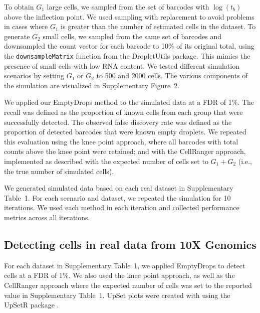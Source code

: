 \documentclass[10pt,letterpaper]{article}
\newcommand{\code}[1]{\texttt{#1}}
\newcommand{\supptabdataset}{1}
\newcommand{\suppfigsimdesign}{2}
\begin{document}
To obtain $G_1$ large cells, we sampled from the set of barcodes with $\log(t_b)$ above the inflection point.
We used sampling with replacement to avoid problems in cases where $G_1$ is greater than the number of estimated cells in the dataset.
To generate $G_2$ small cells, we sampled from the same set of barcodes and downsampled the count vector for each barcode to 10\% of its original total,
using the \code{downsampleMatrix} function from the \textsf{DropletUtils} package.
This mimics the presence of small cells with low RNA content. 
We tested different simulation scenarios by setting $G_1$ or $G_2$ to 500 and 2000 cells.
The various components of the simulation are visualized in Supplementary Figure~\suppfigsimdesign{}.

We applied our EmptyDrops method to the simulated data at a FDR of 1\%. 
The recall was defined as the proportion of known cells from each group that were successfully detected.
The observed false discovery rate was defined as the proportion of detected barcodes that were known empty droplets.
We repeated this evaluation using the knee point approach, where all barcodes with total counts above the knee point were retained;
and with the CellRanger approach, implemented as described \cite{zheng2017massively} with the expected number of cells set to $G_1+G_2$ (i.e., the true number of simulated cells).

We generated simulated data based on each real dataset in Supplementary Table~\supptabdataset{}.
For each scenario and dataset, we repeated the simulation for 10 iterations.
We used each method in each iteration and collected performance metrics across all iterations.

\subsection*{Detecting cells in real data from 10X Genomics}
For each dataset in Supplementary Table~\supptabdataset{}, we applied EmptyDrops to detect cells at a FDR of 1\%. 
We also used the knee point approach, as well as the CellRanger approach where the expected number of cells was set to the reported value in Supplementary Table~\supptabdataset{}.
UpSet plots were created with using the \textsf{UpSetR} package \cite{lex2014upset}.
\end{document}
